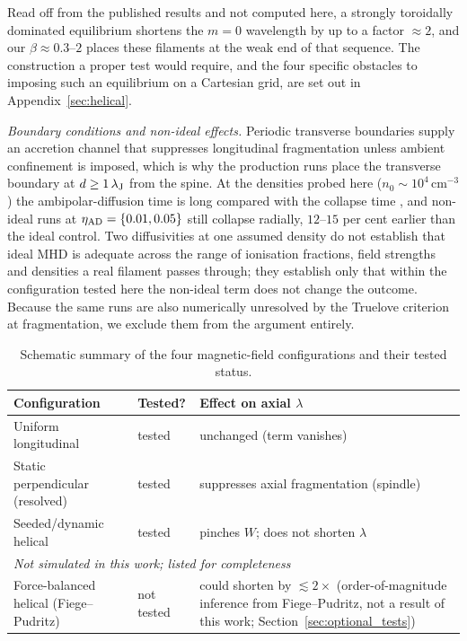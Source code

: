 \documentclass[usenatbib,twoside,twocolumn]{mnras}
\begin{document}
Read off from the published \citet{Fiege2000} results and not computed here, a strongly toroidally dominated equilibrium shortens the $m=0$ wavelength by up to a factor $\approx2$, and our $\beta\approx0.3$--$2$ places these filaments at the weak end of that sequence. The construction a proper test would require, and the four specific obstacles to imposing such an equilibrium on a Cartesian grid, are set out in Appendix~\ref{sec:helical}.

\emph{Boundary conditions and non-ideal effects.} Periodic transverse boundaries supply an accretion channel that suppresses longitudinal fragmentation unless ambient confinement is imposed, which is why the production runs place the transverse boundary at $d\geq1\,\lambda_{\rm J}$ from the spine. At the densities probed here ($n_0\sim10^4$\,cm$^{-3}$) the ambipolar-diffusion time is long compared with the collapse time \citep{Tassis2004}, and non-ideal runs at $\eta_{\rm AD}=\{0.01,0.05\}$ still collapse radially, $12$--$15$ per cent earlier than the ideal control. Two diffusivities at one assumed density do not establish that ideal MHD is adequate across the range of ionisation fractions, field strengths and densities a real filament passes through; they establish only that within the configuration tested here the non-ideal term does not change the outcome. Because the same runs are also numerically unresolved by the Truelove criterion at fragmentation, we exclude them from the argument entirely.




\begin{table}
\caption{Schematic summary of the four magnetic-field configurations and their tested status.}
\label{tab:magcases}
\footnotesize
\setlength{\tabcolsep}{4pt}
\begin{tabular}{@{}p{2.9cm}lp{3.0cm}@{}}
\toprule
Configuration & Tested? & Effect on axial $\lambda$ \\
\midrule
Uniform longitudinal & tested & unchanged (term vanishes) \\
Static perpendicular (resolved) & tested & suppresses axial fragmentation (spindle) \\
Seeded/dynamic helical & tested & pinches $W$; does not shorten $\lambda$ \\
\midrule
\multicolumn{3}{l}{\emph{Not simulated in this work; listed for completeness}}\\
Force-balanced helical (Fiege--Pudritz) & not tested & could shorten by $\lesssim2\times$ (order-of-magnitude inference from Fiege--Pudritz, not a result of this work; Section~\ref{sec:optional_tests}) \\
\bottomrule
\end{tabular}
\end{table}
\end{document}
